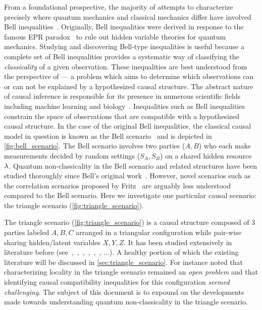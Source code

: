 \documentclass[aps, 10pt, english, twoside, pra, nofootinbib, tightenlines, longbibliography]{revtex4-1}
\begin{document}
    From a foundational prospective, the majority of attempts to characterize precisely where quantum mechanics and classical mechanics differ have involved Bell inequalities~\cite{Bell_1964}. Originally, Bell inequalities were derived in response to the famous EPR paradox~\cite{EPR_Orig} to rule out hidden variable theories for quantum mechanics. Studying and discovering Bell-type inequalities is useful because a complete set of Bell inequalities provides a systematic way of classifying the \textit{classicality} of a given observation. These inequalities are best understood from the perspective of  --- a problem which aims to determine which observations can or can not be explained by a hypothesized causal structure. The abstract nature of causal inference is responsible for its presence in numerous scientific fields including machine learning and biology~\cite{Pearl_2009,Pearl_2009_tr}. Inequalities such as Bell inequalities constrain the space of observations that are compatible with a hypothesized causal structure. In the case of the original Bell inequalities, the classical causal model in question is known as the Bell scenario~\cite{Wood_2012} and is depicted in \cref{fig:bell_scenario}. The Bell scenario involves two parties ($A, B$) who each make measurements decided by random settings ($S_A, S_B$) on a shared hidden resource $\lambda$. Quantum non-classicality in the Bell scenario and related structures have been studied thoroughly since Bell's original work~\cite{Brunner_2013}. However, novel scenarios such as the correlation scenarios proposed by Fritz~\cite{Fritz_2012,Fritz_2014} are arguably less understood compared to the Bell scenario. Here we investigate one particular causal scenario: the triangle scenario (\cref{fig:triangle_scenario}).

    The triangle scenario (\cref{fig:triangle_scenario}) is a causal structure composed of $3$ parties labeled $A, B, C$ arranged in a triangular configuration while pair-wise sharing hidden/latent variables $X, Y, Z$. It has been studied extensively in literature before (see~\cite[Fig. 1]{Steudel_2010},~\cite[Fig. 6]{Chaves_2014},~\cite[Fig. 8]{Branciard_2012},~\cite[Fig. 8, Appendix E]{Henson_2014},~\cite[Fig. 3]{Fritz_2012},~\cite[Fig. 1]{Inflation}, $\ldots$). A healthy portion of which the existing literature will be discussed in \cref{sec:triangle_scenario}. For instance \citet{Branciard_2012} noted that characterizing locality in the triangle scenario remained an \textit{open problem} and that identifying causal compatibility inequalities for this configuration \textit{seemed challenging}. The subject of this document is to expound on the developments made towards understanding quantum non-classicality in the triangle scenario.
\end{document}
